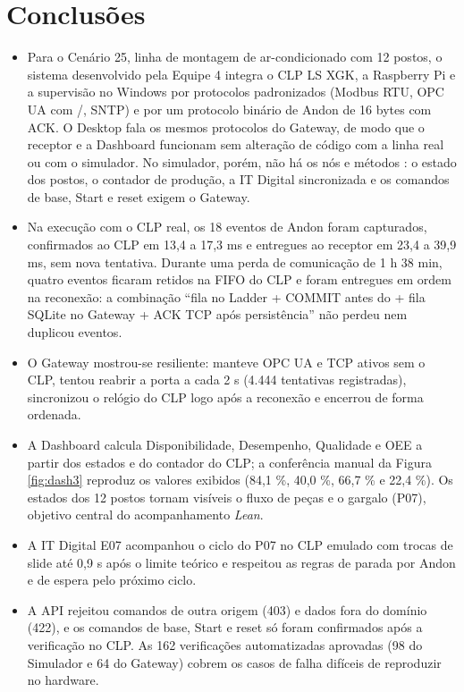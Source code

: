 \section{Conclusões}

\begin{itemize}
    \item Para o Cenário 25, linha de montagem de ar-condicionado com 12 postos, o sistema desenvolvido pela Equipe 4 integra o CLP LS XGK, a Raspberry Pi e a supervisão no Windows por protocolos padronizados (Modbus RTU, OPC UA com /, SNTP) e por um protocolo binário de Andon de 16 bytes com ACK. O Desktop fala os mesmos protocolos do Gateway, de modo que o receptor e a Dashboard funcionam sem alteração de código com a linha real ou com o simulador. No simulador, porém, não há os nós e métodos : o estado dos postos, o contador de produção, a IT Digital sincronizada e os comandos de base, Start e reset exigem o Gateway.
    \item Na execução com o CLP real, os 18 eventos de Andon foram capturados, confirmados ao CLP em 13,4 a 17,3 ms e entregues ao receptor em 23,4 a 39,9 ms, sem nova tentativa. Durante uma perda de comunicação de 1 h 38 min, quatro eventos ficaram retidos na FIFO do CLP e foram entregues em ordem na reconexão: a combinação ``fila no Ladder + COMMIT antes do  + fila SQLite no Gateway + ACK TCP após persistência'' não perdeu nem duplicou eventos.
    \item O Gateway mostrou-se resiliente: manteve OPC UA e TCP ativos sem o CLP, tentou reabrir a porta a cada 2 s (4.444 tentativas registradas), sincronizou o relógio do CLP logo após a reconexão e encerrou de forma ordenada.
    \item A Dashboard calcula Disponibilidade, Desempenho, Qualidade e OEE a partir dos estados e do contador do CLP; a conferência manual da Figura \ref{fig:dash3} reproduz os valores exibidos (84,1 \%, 40,0 \%, 66,7 \% e 22,4 \%). Os estados dos 12 postos tornam visíveis o fluxo de peças e o gargalo (P07), objetivo central do acompanhamento \textit{Lean}.
    \item A IT Digital E07 acompanhou o ciclo do P07 no CLP emulado com trocas de slide até 0,9 s após o limite teórico e respeitou as regras de parada por Andon e de espera pelo próximo ciclo.
    \item A API rejeitou comandos de outra origem (403) e dados fora do domínio (422), e os comandos de base, Start e reset só foram confirmados após a verificação no CLP. As 162 verificações automatizadas aprovadas (98 do Simulador e 64 do Gateway) cobrem os casos de falha difíceis de reproduzir no hardware.

\end{itemize}
